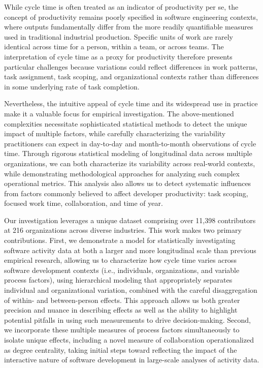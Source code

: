 \documentclass[
]{article}
\begin{document}
While cycle time is often treated as an indicator of productivity per
se, the concept of productivity remains poorly specified in software
engineering contexts, where outputs fundamentally differ from the more
readily quantifiable measures used in traditional industrial production.
Specific units of work are rarely identical across time for a person,
within a team, or across teams. The interpretation of cycle time as a
proxy for productivity therefore presents particular challenges because
variations could reflect differences in work patterns, task assignment,
task scoping, and organizational contexts rather than differences in
some underlying rate of task completion.

Nevertheless, the intuitive appeal of cycle time and its widespread use
in practice make it a valuable focus for empirical investigation. The
above-mentioned complexities necessitate sophisticated statistical
methods to detect the unique impact of multiple factors, while carefully
characterizing the variability practitioners can expect in day-to-day
and month-to-month observations of cycle time. Through rigorous
statistical modeling of longitudinal data across multiple organizations,
we can both characterize its variability across real-world contexts,
while demonstrating methodological approaches for analyzing such complex
operational metrics. This analysis also allows us to detect systematic
influences from factors commonly believed to affect developer
productivity: task scoping, focused work time, collaboration, and time
of year.

Our investigation leverages a unique dataset comprising over 11,398
contributors at 216 organizations across diverse industries. This work
makes two primary contributions. First, we demonstrate a model for
statistically investigating software activity data at both a larger and
more longitudinal scale than previous empirical research, allowing us to
characterize how cycle time varies across software development contexts
(i.e., individuals, organizations, and variable process factors), using
hierarchical modeling that appropriately separates individual and
organizational variation, combined with the careful disaggregation of
within- and between-person effects. This approach allows us both greater
precision and nuance in describing effects as well as the ability to
highlight potential pitfalls in using such measurements to drive
decision-making. Second, we incorporate these multiple measures of
process factors simultaneously to isolate unique effects, including a
novel measure of collaboration operationalized as degree centrality,
taking initial steps toward reflecting the impact of the interactive
nature of software development in large-scale analyses of activity data.
\end{document}

